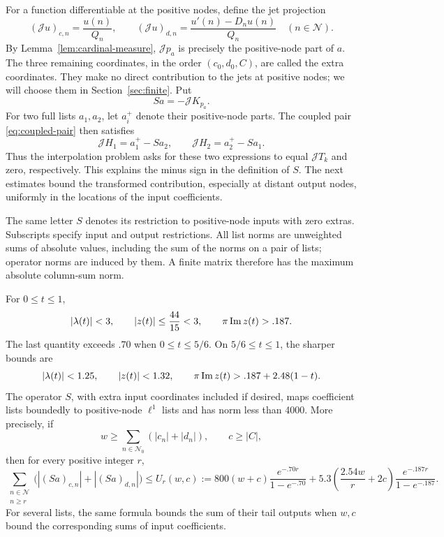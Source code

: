 For a function differentiable at the positive nodes, define the jet projection
\begin{equation}\label{eq:jet-projection}
 (\mathcal Ju)_{c,n}=\frac{u(n)}{Q_n},\qquad
 (\mathcal Ju)_{d,n}=\frac{u'(n)-D_nu(n)}{Q_n}
       \quad(n\in\mathcal N).
\end{equation}
By Lemma~\ref{lem:cardinal-measure}, \(\mathcal Jp_a\) is precisely the
positive-node part of \(a\).  The three remaining coordinates, in the order
\((c_0,d_0,C)\), are called the extra coordinates.  They make no direct
contribution to the jets at positive nodes; we will choose them in
Section~\ref{sec:finite}.  Put
\begin{equation}\label{eq:jet-operator}
 Sa=-\mathcal J K_{p_a}.
\end{equation}
For two full lists \(a_1,a_2\), let \(a_i^+\) denote their positive-node
parts.  The coupled pair \eqref{eq:coupled-pair} then satisfies
\[
 \mathcal JH_1=a_1^+-Sa_2,\qquad
 \mathcal JH_2=a_2^+-Sa_1.
\]
Thus the interpolation problem asks for these two expressions to equal
\(\mathcal JT_k\) and zero, respectively.  This explains the minus sign
in the definition of \(S\).  The next estimates bound the transformed
contribution, especially at distant output nodes, uniformly in the locations
of the input coefficients.

The same letter \(S\) denotes its restriction to positive-node inputs with
zero extras.  Subscripts specify input and output restrictions.  All list
norms are unweighted sums of absolute values, including the sum of the norms
on a pair of lists; operator norms are induced by them.  A finite matrix
therefore has the maximum absolute column-sum norm.

\begin{lemma}\label{lem:kernel-bounds}
For \(0\le t\le1\),
\begin{equation}\label{eq:global-kernel-bounds}
 |\lambda(t)|<3,\qquad |z(t)|\le\frac{44}{15}<3,
 \qquad \pi\operatorname{Im} z(t)>.187.
\end{equation}
The last quantity exceeds \(.70\) when \(0\le t\le5/6\).  On
\(5/6\le t\le1\), the sharper bounds are
\begin{equation}\label{eq:last-interval-bounds}
 |\lambda(t)|<1.25,\qquad |z(t)|<1.32,
 \qquad \pi\operatorname{Im} z(t)>.187+2.48(1-t).
\end{equation}
The operator \(S\), with extra input coordinates included if desired, maps
coefficient lists boundedly to positive-node \(\ell^1\) lists and has norm
less than 4000.  More precisely, if
\[
 w\ge\sum_{n\in\mathcal N_0}(|c_n|+|d_n|),\qquad c\ge|C|,
\]
then for every positive integer \(r\),
\begin{equation}\label{eq:tail-bound}
 \sum_{\substack{n\in\mathcal N\\n\ge r}}
       \bigl(|(Sa)_{c,n}|+|(Sa)_{d,n}|\bigr)
 \le U_r(w,c):=
 800(w+c)\frac{e^{-.70r}}{1-e^{-.70}}
 +5.3\left(\frac{2.54w}{r}+2c\right)
                  \frac{e^{-.187r}}{1-e^{-.187}}.
\end{equation}
For several lists, the same formula bounds the sum of their tail outputs when
\(w,c\) bound the corresponding sums of input coefficients.
\end{lemma}

